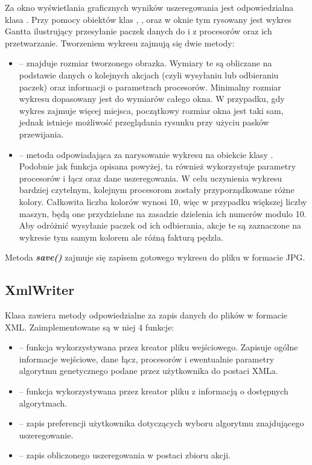 Za okno wyświetlania graficznych wyników uszeregowania jest odpowiedzialna klasa . Przy pomocy obiektów klas , 
,  oraz  w oknie tym rysowany jest wykres Gantta ilustrujący przesyłanie paczek danych do i 
z procesorów oraz ich przetwarzanie. Tworzeniem wykresu zajmują się dwie metody:
\begin{itemize}
	\item {} -- znajduje rozmiar tworzonego obrazka. Wymiary te są obliczane na podstawie danych o kolejnych akcjach (czyli wysyłaniu 
	lub odbieraniu paczek) oraz informacji o parametrach procesorów. Minimalny rozmiar wykresu dopasowany jest do wymiarów całego okna. W przypadku, 
	gdy wykres zajmuje więcej miejsca, początkowy rozmiar okna jest taki sam, jednak istnieje możliwość przeglądania rysunku przy użyciu pasków 
	przewijania.
	\item {} -- metoda odpowiadająca za narysowanie wykresu na obiekcie klasy . Podobnie jak funkcja opisana powyżej, ta również 
	wykorzystuje parametry procesorów i łącz oraz dane uszeregowania. W celu uczynienia wykresu bardziej czytelnym, kolejnym procesorom zostały 
	przyporządkowane różne kolory. Całkowita liczba kolorów wynosi 10, więc w przypadku większej liczby maszyn, będą one przydzielane na zasadzie dzielenia 
	ich numerów modulo 10. Aby odróżnić wysyłanie paczek od ich odbierania, akcje te są zaznaczone na wykresie tym samym kolorem ale różną 
	fakturą pędzla.
\end{itemize}

\medskip
Metoda \textbf{\emph{save()}} zajmuje się zapisem gotowego wykresu do pliku w formacie JPG.

\subsection{XmlWriter}

Klasa  zawiera metody odpowiedzialne za zapis danych do plików w formacie XML. Zaimplementowane są w niej 4 funkcje:
\begin{itemize}
	\item {} -- funkcja wykorzystywana przez kreator pliku wejściowego. Zapisuje ogólne informacje 
	wejściowe, dane łącz, procesorów i ewentualnie parametry algorytmu genetycznego podane przez użytkownika do postaci XMLa.
	\item {} -- funkcja wykorzystywana przez kreator pliku z informacją o dostępnych 
	algorytmach.
	\item {} -- zapis preferencji użytkownika dotyczących wyboru algorytmu 
	znajdującego uszeregowanie.
	\item {} -- zapis obliczonego uszeregowania w postaci zbioru akcji.
\end{itemize}

